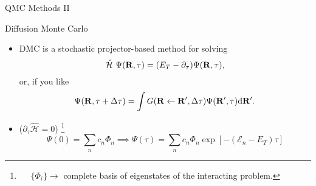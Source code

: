 \documentclass[10pt, pdf, hyperref={draft}, usenames, dvipsnames]{beamer}
\newcommand{\dd}{\mathrm{d}}
\newcommand{\green}[1]{{\bf\color{ForestGreen}{#1}}}
\begin{document}
%
%
%
%
%
%
%
%



\begin{frame}{QMC Methods II}
  \begin{block}{Diffusion Monte Carlo}
    \begin{itemize}
      \item DMC is a stochastic projector-based method for solving
      \begin{equation}
      \mathcal{\hat H}\ \Psi({\bf R}, \tau)
      = (E_T-\partial_{\tau})\Psi({\bf R}, \tau),
      \end{equation}
      or, if you like
      \begin{equation}
      \Psi({\bf R}, \tau+\Delta \tau)
      = \displaystyle\int G({\bf R} \leftarrow {\bf R'},\Delta \tau)
      \Psi({\bf R'}, \tau) \dd{\bf R'}.
      \end{equation}
      \item \green{Separable} ($\partial_\tau\mathcal{\hat H}=0$)
      \footnote{~~ $\{\Phi_i\} \rightarrow$ complete basis of eigenstates of the
      interacting problem.}
      \begin{equation}
      \Psi(0) = \sum_n c_n \Phi_n \implies
      \Psi(\tau) = \sum_n c_n \Phi_n\exp{\left[-(\mathcal{E}_n -
      E_T)\tau\right]}
      \end{equation}
    \end{itemize}
  \end{block}
\end{frame}
\end{document}
